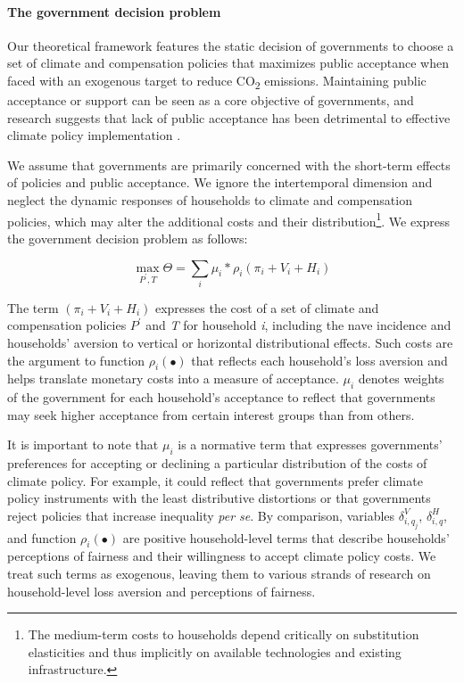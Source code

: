 \documentclass[12pt, a4paper]{article}
\begin{document}
\paragraph{The government decision problem}
Our theoretical framework features the static decision of governments to choose a set of climate and compensation policies that maximizes public acceptance when faced with an exogenous target to reduce CO\textsubscript{2} emissions. Maintaining public acceptance or support can be seen as a core objective of governments, and research suggests that lack of public acceptance has been detrimental to effective climate policy implementation \autocite{Carattini.2018,Bergquist.2022,Douenne.2022}.

We assume that governments are primarily concerned with the short-term effects of policies and public acceptance. We ignore the intertemporal dimension and neglect the dynamic responses of households to climate and compensation policies, which may alter the additional costs and their distribution\footnote{The medium-term costs to households depend critically on substitution elasticities and thus implicitly on available technologies and existing infrastructure.}. We express the government decision problem as follows:  

\begin{equation} \label{eq:theta}
    \max_{P^{\prime},T} \Theta = \sum_{i} \mu_{i} * \rho_{i}(\pi_{i} + V_{i} + H_{i})
\end{equation}

The term $(\pi_{i} + V_{i} + H_{i})$ expresses the cost of a set of climate and compensation policies $P^{\prime}$ and \textit{T} for household \textit{i}, including the nave incidence and households' aversion to vertical or horizontal distributional effects. Such costs are the argument to function $\rho_{i}(\bullet)$ that reflects each household's loss aversion \autocite{Tversky.1991} and helps translate monetary costs into a measure of acceptance. $\mu_{i}$ denotes weights of the government for each household's acceptance to reflect that governments may seek higher acceptance from certain interest groups than from others.

It is important to note that $\mu_{i}$ is a normative term that expresses governments' preferences for accepting or declining a particular distribution of the costs of climate policy. For example, it could reflect that governments prefer climate policy instruments with the least distributive distortions \autocite{Fischer.2019} or that governments reject policies that increase inequality \textit{per se}. By comparison, variables $\delta_{i,q_{j}}^{V}$, $\delta_{i,q}^{H}$, and function $\rho_{i}(\bullet)$ are positive household-level terms that describe households' perceptions of fairness and their willingness to accept climate policy costs. We treat such terms as exogenous, leaving them to various strands of research on household-level loss aversion and perceptions of fairness. 
\end{document}
